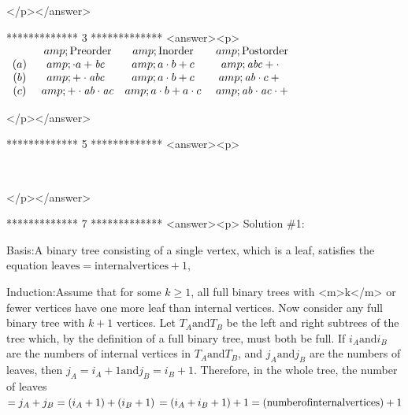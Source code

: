 </p></answer>


*************
3
*************
<answer><p>  \(\begin{array}{cccc}
   &amp; \text{Preorder}  &amp; \text{Inorder}\text{   } &amp; \text{Postorder} \\
 (a)\text{   } &amp; \cdot a+\text{\textit{bc}}\text{\textit{      }} &amp; a\cdot b+c\text{   } &amp; \text{\textit{abc}}+\cdot \text{     } \\
 (b)\text{   } &amp; +\cdot \text{\textit{abc}}\text{\textit{      }} &amp; a\cdot b+c\text{    } &amp; \text{\textit{ab}}\cdot c+\text{     } \\
 (c)\text{   } &amp; +\cdot \text{\textit{ab}}\cdot \text{\textit{ac}}\text{\textit{$ $}} &amp; a\cdot b+a\cdot c\text{  } &amp; \text{\textit{ab}}\cdot \text{\textit{ac}}\cdot
+  \\
\end{array}\)

</p></answer>


*************
5
*************
<answer><p>

\begin{doublespace}
\noindent\(\)
\end{doublespace}

</p></answer>


*************
7
*************
<answer><p> Solution $\#$1:



Basis:A binary tree consisting of a single vertex, which is a leaf, satisfies the equation \(\text{leaves} = \text{internal} \text{vertices}
+ 1\),



Induction:Assume that for some \(k\geq 1\), all full binary trees with <m>k</m> or fewer vertices have one more leaf than internal vertices.
Now consider any full binary tree with \(k+1\) vertices. Let \(T_A\text{and} T_B\) be the left and right subtrees of the tree which, by the definition
of a full binary tree, must both be full. If \(i_A\text{and} i_B\) are the numbers of internal vertices in \(T_A\text{and} T_B\), and \(j_A\text{and}
j_B\) are the numbers of leaves, then \(j_A=i_A+1 \text{and} j_B=i_B+1\). Therefore, in the whole tree, the number of leaves \(=j_A+j_B\\
\\
=\left(i_A+1\right)+\left(i_B+1\right)\\
\\
=\left(i_A+i_B+1\right)+1\\
\\
=(\text{number} \text{of} \text{internal} \text{vertices})+1\)



